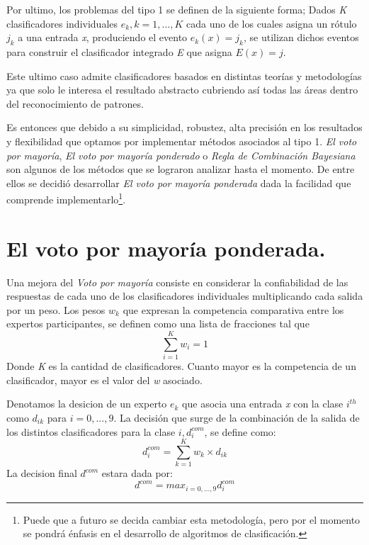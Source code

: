 Por ultimo, los problemas del tipo 1 se definen de la siguiente forma; Dados \textit{K} clasificadores individuales $ e_{k}, k = 1,...,K $ cada uno de los cuales asigna un rótulo $ j_{k} $ a una entrada \textit{x}, produciendo el evento $ e_{k}(x) = j_{k} $, se utilizan dichos eventos para construir el clasificador integrado \textit{E} que asigna $ E(x) = j $. 

Este ultimo caso admite clasificadores basados en distintas teorías y metodologías ya que solo le interesa el resultado abstracto cubriendo así todas las áreas dentro del reconocimiento de patrones. 

Es entonces que debido a su simplicidad, robustez, alta precisión en los resultados y flexibilidad que optamos por implementar métodos asociados al tipo 1. \textit{El voto por mayoría}, \textit{El voto por mayoría ponderado} o \textit{Regla de Combinación Bayesiana} son algunos de los métodos que se lograron analizar hasta el momento. De entre ellos se decidió desarrollar \textit{El voto por mayoría ponderada} dada la facilidad que comprende implementarlo\footnote{Puede que a futuro se decida cambiar esta metodología, pero por el momento se pondrá énfasis en el desarrollo de algoritmos de clasificación.}.

\section{El voto por mayoría ponderada.}
Una mejora del \textit{Voto por mayoría} consiste en considerar la confiabilidad de las respuestas de cada uno de los clasificadores individuales multiplicando cada salida por un peso. Los pesos $ w_{k} $ que expresan la competencia comparativa entre los expertos participantes, se definen como una lista de fracciones tal que
\[ \sum_{i=1}^{K}w_{i} = 1 \]
Donde \textit{K} es la cantidad de clasificadores. Cuanto mayor es la competencia de un clasificador, mayor es el valor del \textit{w} asociado.

Denotamos la desicion de un experto $ e_{k} $ que asocia una entrada \textit{x} con la clase $ i^{th} $ como $ d_{ik} $ para $ i = 0,...,9 $. La decisión que surge de la combinación de la salida de los distintos clasificadores para la clase $ i, d_{i}^{com} $, se define como:
\[ d_{i}^{com} = \sum_{k=1}^{K}w_{k} \times d_{ik} \]
La decision final $ d^{com} $ estara dada por:
\[ d^{com} = max_{i = 0,...,9} d_{i}^{com} \]
